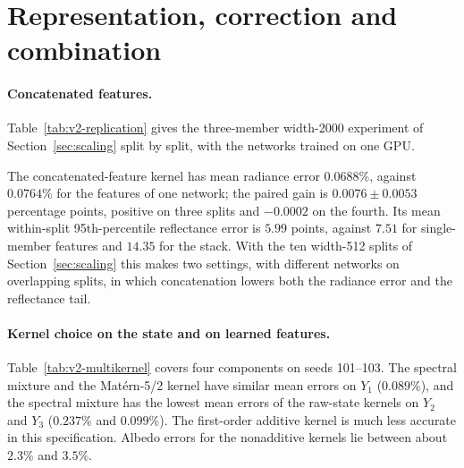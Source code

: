\section{Representation, correction and combination}\label{sec:results-representation}

\paragraph{Concatenated features.}
Table~\ref{tab:v2-replication} gives the three-member width-2000 experiment of
Section~\ref{sec:scaling} split by split, with the networks trained on one GPU.

\begin{table}[p]
\centering

\caption{Kernel on concatenated features, three width-2000 networks, splits 104--107. Radiance
is a mean relative spectral error in percent; reflectance median and 95th-percentile errors are
in percentage points. The last column is the paired radiance gain of concatenated features over
the features of one network. The mean row averages the four within-split quantities.}
\label{tab:v2-replication}
\end{table}

The concatenated-feature kernel has mean radiance error $0.0688\%$, against $0.0764\%$ for the
features of one network; the paired gain is $0.0076\pm0.0053$ percentage points, positive on
three splits and $-0.0002$ on the fourth. Its mean within-split 95th-percentile reflectance error
is $5.99$ points, against $7.51$ for single-member features and $14.35$ for the stack. With the
ten width-512 splits of Section~\ref{sec:scaling} this makes two settings, with different
networks on overlapping splits, in which concatenation lowers both the radiance error and the
reflectance tail.

\paragraph{Kernel choice on the state and on learned features.}
Table~\ref{tab:v2-multikernel} covers four components on seeds 101--103. The spectral mixture
and the Mat\'ern-5/2 kernel have similar mean errors on $Y_1$ ($0.089\%$), and the spectral
mixture has the lowest mean errors of the raw-state kernels on $Y_2$ and $Y_3$ ($0.237\%$ and
$0.099\%$). The first-order additive kernel is much less accurate in this specification.
Albedo errors for the nonadditive kernels lie between about $2.3\%$ and $3.5\%$.

